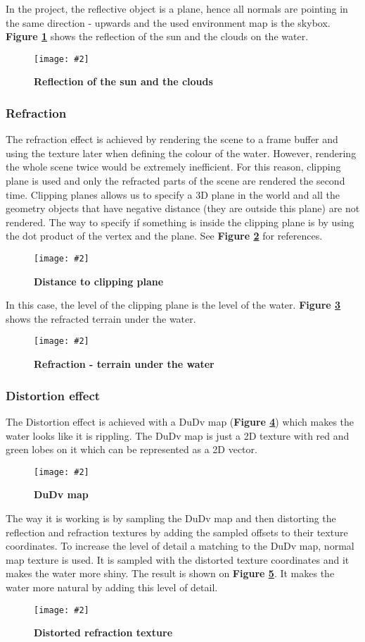 \documentclass[10pt, a4paper]{article}
\newcommand{\figuremacro}[5]{
    \begin{figure}[#1]
        \centering
        \texttt{[image: \#2]}
        \caption[#3]{\textbf{#3}#4}
        \label{fig:#2}
    \end{figure}
}
\begin{document}
	In the project, the reflective object is a plane, hence all normals are pointing in the same direction - upwards and the used environment map is the skybox. \textbf{Figure {\ref{fig:reflectedSun}}} shows the reflection of the sun and the clouds on the water.
	\figuremacro{h}{reflectedSun}{Reflection of the sun and the clouds}{ }{0.9}
	\subsubsection{Refraction}
	The refraction effect is achieved by rendering the scene to a frame buffer and using the texture later when defining the colour of the water. However, rendering the whole scene twice would be extremely inefficient. For this reason, clipping plane is used and only the refracted parts of the scene are rendered the second time. Clipping planes allows us to specify a 3D plane in the world and all the geometry objects that have negative distance (they are outside this plane) are not rendered. The way to specify if something is inside the clipping plane is by using the dot product of the vertex and the plane.  See \textbf{Figure {\ref{fig:clippingPlane}}} for references. 
	\figuremacro{h}{clippingPlane}{Distance to clipping plane}{ }{1.0}
	
	In this case, the level of the clipping plane is the level of the water. \textbf{Figure {\ref{fig:refraction}}} shows the refracted terrain under the water.
	\figuremacro{h}{refraction}{Refraction - terrain under the water}{ }{0.9}
	\subsubsection{Distortion effect}
	The Distortion effect is achieved with a DuDv map (\textbf{Figure {\ref{fig:DuDvMap}}}) which makes the water looks like it is rippling. The DuDv map is just a 2D texture with red and green lobes on it which can be represented as a 2D vector.
	\figuremacro{h}{DuDvMap}{DuDv map}{ }{0.7}
	
	The way it is working is by sampling the DuDv map and then distorting the reflection and refraction textures by adding the sampled offsets to their texture coordinates. To increase the level of detail a matching to the DuDv map, normal map texture is used. It is sampled with the distorted texture coordinates and it makes the water more shiny. The result is shown on \textbf{Figure {\ref{fig:distortion}}}. It makes the water more natural by adding this level of detail.
	\figuremacro{h}{distortion}{Distorted refraction texture}{ }{1.0}
	
\end{document}
